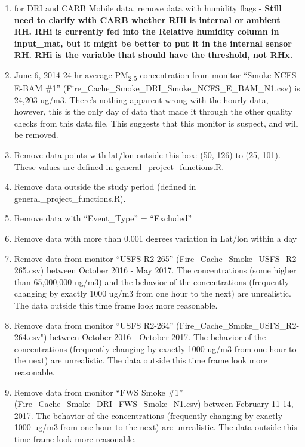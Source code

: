 \begin{enumerate}[nolistsep]
\begin{enumerate}[nolistsep]
	\item for DRI and CARB Mobile data, remove data with humidity flags - \textbf{Still need to clarify with CARB whether RHi is internal or ambient RH. RHi is currently fed into the Relative humidity column in input\_mat, but it might be better to put it in the internal sensor RH. RHi is the variable that should have the threshold, not RHx.} 
	\item June 6, 2014 24-hr average PM\textsubscript{2.5} concentration from monitor ``Smoke NCFS E-BAM \#1'' (Fire\_Cache\_Smoke\_DRI\_Smoke\_NCFS\_E\_BAM\_N1.csv) is 24,203 ug/m3. There's nothing apparent wrong with the hourly data, however, this is the only day of data that made it through the other quality checks from this data file. This suggests that this monitor is suspect, and will be removed.
	\item Remove data points with lat/lon outside this box: (50,-126) to (25,-101). These values are defined in general\_project\_functions.R. %
	\item Remove data outside the study period (defined in general\_project\_functions.R).
	\item Remove data with ``Event\_Type'' = ``Excluded''
	\item Remove data with more than 0.001 degrees variation in Lat/lon within a day
	\item Remove data from monitor ``USFS R2-265'' (Fire\_Cache\_Smoke\_USFS\_R2-265.csv) between October 2016 - May 2017. The concentrations (some higher than 65,000,000 ug/m3) and the behavior of the concentrations (frequently changing by exactly 1000 ug/m3 from one hour to the next) are unrealistic. The data outside this time frame look more reasonable.
	\item Remove data from monitor ``USFS R2-264'' (Fire\_Cache\_Smoke\_USFS\_R2-264.csv") between October 2016 - October 2017. The behavior of the concentrations (frequently changing by exactly 1000 ug/m3 from one hour to the next) are unrealistic. The data outside this time frame look more reasonable.
	\item Remove data from monitor ``FWS Smoke \#1'' (Fire\_Cache\_Smoke\_DRI\_FWS\_Smoke\_N1.csv) between February 11-14, 2017. The behavior of the concentrations (frequently changing by exactly 1000 ug/m3 from one hour to the next) are unrealistic. The data outside this time frame look more reasonable.

\end{enumerate}
\end{enumerate}
